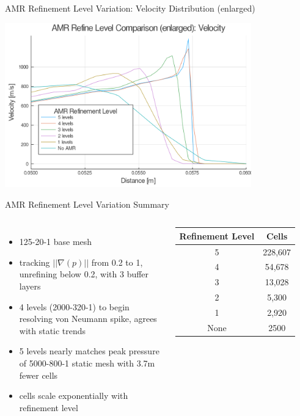 \begin{frame}{AMR Refinement Level Variation: Velocity Distribution (enlarged)}
\begin{center}
\includegraphics[width=0.8\textwidth]{../figs/amrfigs/amr_refinelevels/ue.png}
\end{center}
\end{frame}

\begin{frame}{AMR Refinement Level Variation Summary}
\begin{columns}
\begin{itemize}
\item 125-20-1 base mesh
\item tracking $||\nabla (p)||$ from 0.2 to 1, unrefining below 0.2, with 3 buffer layers
\item 4 levels (2000-320-1) to begin resolving von Neumann spike, agrees with static trends
\item 5 levels nearly matches peak pressure of 5000-800-1 static mesh with 3.7m fewer cells
\item cells scale exponentially with refinement level
\end{itemize}

\begin{table}[h]
\centering
\begin{tabular}{cc}
Refinement Level & Cells \\ \hline
5 & 228,607 \\ 
4 & 54,678 \\ 
3 & 13,028 \\ 
2 & 5,300 \\
1 & 2,920 \\
None & 2500 \\
\end{tabular}
\end{table}
\end{columns}
\end{frame}

